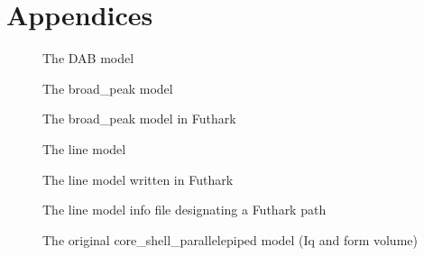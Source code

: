 \documentclass[11pt]{article}
\begin{document}
\section*{Appendices}

\begin{figure}
  
  \label{fig:dabmodel}
  \caption{The DAB model}
\end{figure}

\begin{figure}
  
  \label{fig:broadpeakmodel}
  \caption{The broad_peak model}
\end{figure}

\begin{figure}
  
  \label{fig:broadpeakmodel_futhark}
  \caption{The broad_peak model in Futhark}
\end{figure}

\begin{figure}
  
  \label{fig:linemodel}
  \caption{The line model}
\end{figure}

\begin{figure}
  
  \label{fig:linemodel-futhark}
  \caption{The line model written in Futhark}
\end{figure}

\begin{figure}
  
  \label{fig:linemodelinfo-futhark}
  \caption{The line model info file designating a Futhark path}
\end{figure}

\begin{figure}
  
  
  \label{fig:core_shell}
  \caption{The original core\_shell\_parallelepiped model (Iq and form volume)}
\end{figure}
\end{document}
